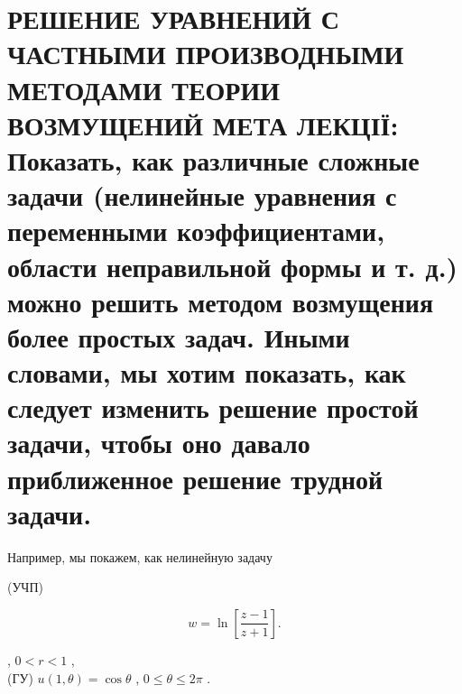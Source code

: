 \documentclass[
  ukrainian,
]{article}
\begin{document}
\section{РЕШЕНИЕ УРАВНЕНИЙ С ЧАСТНЫМИ ПРОИЗВОДНЫМИ МЕТОДАМИ ТЕОРИИ
ВОЗМУЩЕНИЙ МЕТА ЛЕКЦІЇ: Показать, как различные сложные задачи
(нелинейные уравнения с переменными коэффициентами, области неправильной
формы и т. д.) можно решить методом возмущения более простых задач.
Иными словами, мы хотим показать, как следует изменить решение простой
задачи, чтобы оно давало приближенное решение трудной
задачи.}\label{ux440ux435ux448ux435ux43dux438ux435-ux443ux440ux430ux432ux43dux435ux43dux438ux439-ux441-ux447ux430ux441ux442ux43dux44bux43cux438-ux43fux440ux43eux438ux437ux432ux43eux434ux43dux44bux43cux438-ux43cux435ux442ux43eux434ux430ux43cux438-ux442ux435ux43eux440ux438ux438-ux432ux43eux437ux43cux443ux449ux435ux43dux438ux439-ux43cux435ux442ux430-ux43bux435ux43aux446ux456ux457-ux43fux43eux43aux430ux437ux430ux442ux44c-ux43aux430ux43a-ux440ux430ux437ux43bux438ux447ux43dux44bux435-ux441ux43bux43eux436ux43dux44bux435-ux437ux430ux434ux430ux447ux438-ux43dux435ux43bux438ux43dux435ux439ux43dux44bux435-ux443ux440ux430ux432ux43dux435ux43dux438ux44f-ux441-ux43fux435ux440ux435ux43cux435ux43dux43dux44bux43cux438-ux43aux43eux44dux444ux444ux438ux446ux438ux435ux43dux442ux430ux43cux438-ux43eux431ux43bux430ux441ux442ux438-ux43dux435ux43fux440ux430ux432ux438ux43bux44cux43dux43eux439-ux444ux43eux440ux43cux44b-ux438-ux442.-ux434.-ux43cux43eux436ux43dux43e-ux440ux435ux448ux438ux442ux44c-ux43cux435ux442ux43eux434ux43eux43c-ux432ux43eux437ux43cux443ux449ux435ux43dux438ux44f-ux431ux43eux43bux435ux435-ux43fux440ux43eux441ux442ux44bux445-ux437ux430ux434ux430ux447.-ux438ux43dux44bux43cux438-ux441ux43bux43eux432ux430ux43cux438-ux43cux44b-ux445ux43eux442ux438ux43c-ux43fux43eux43aux430ux437ux430ux442ux44c-ux43aux430ux43a-ux441ux43bux435ux434ux443ux435ux442-ux438ux437ux43cux435ux43dux438ux442ux44c-ux440ux435ux448ux435ux43dux438ux435-ux43fux440ux43eux441ux442ux43eux439-ux437ux430ux434ux430ux447ux438-ux447ux442ux43eux431ux44b-ux43eux43dux43e-ux434ux430ux432ux430ux43bux43e-ux43fux440ux438ux431ux43bux438ux436ux435ux43dux43dux43eux435-ux440ux435ux448ux435ux43dux438ux435-ux442ux440ux443ux434ux43dux43eux439-ux437ux430ux434ux430ux447ux438.}

Например, мы покажем, как нелинейную задачу

(УЧП)

\[
w = \ln \left[ \frac{z-1}{z+1} \right].
\]

, \(0 < r < 1\) ,\\
(ГУ) \(u(1, \theta) = \cos \theta\) , \(0 \le \theta \le 2\pi\) .
\end{document}
